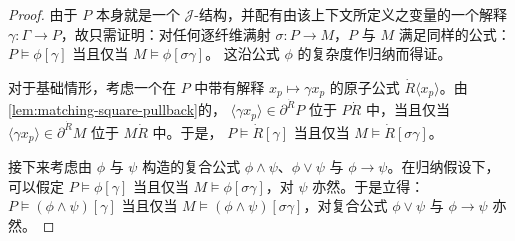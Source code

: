 \begin{proof}
由于 $P$ 本身就是一个 $\mathcal{J}$-结构，并配有由该上下文所定义之变量的一个解释
$\gamma\colon\Gamma\to P$，故只需证明：对任何逐纤维满射 $\sigma\colon P\to M$，$P$
与 $M$ 满足同样的公式：$P\models\phi[\gamma]$ 当且仅当 $M\models\phi[\sigma\gamma]$。
这沿公式 $\phi$ 的复杂度作归纳而得证。

对于基础情形，考虑一个在 $P$ 中带有解释 $x_{p}\mapsto\gamma x_{p}$ 的原子公式
$\dot{R}\langle x_{p}\rangle$。由\cref{lem:matching-square-pullback}的\trPullback，
$\langle\gamma x_{p}\rangle\in\partial^{\dot{R}}P$ 位于 $P\dot{R}$ 中，当且仅当
$\langle\gamma x_{p}\rangle\in\partial^{\dot{R}}M$ 位于 $M\dot{R}$ 中。于是，
$P\models\dot{R}[\gamma]$ 当且仅当 $M\models\dot{R}[\sigma\gamma]$。

接下来考虑由 $\phi$ 与 $\psi$ 构造的复合公式 $\phi\wedge\psi$、$\phi\vee\psi$ 与
$\phi\rightarrow\psi$。在归纳假设下，可以假定 $P\models\phi[\gamma]$ 当且仅当
$M\models\phi[\sigma\gamma]$，对 $\psi$ 亦然。于是立得：$P\models(\phi\wedge\psi)[\gamma]$
当且仅当 $M\models(\phi\wedge\psi)[\sigma\gamma]$，对复合公式 $\phi\vee\psi$ 与
$\phi\rightarrow\psi$ 亦然。


\end{proof}
